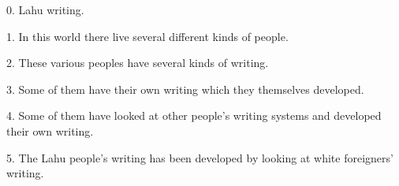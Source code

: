 \setcounter{footnote}{0}

0. Lahu writing.

1. In this world there live several different kinds of people.

2. These various peoples have several kinds of writing.

3. Some of them have their own writing which they themselves developed.

4. Some of them have looked at other people's writing systems and developed their
own writing.

5. The Lahu people's writing has been developed by looking at white foreigners'
writing.

